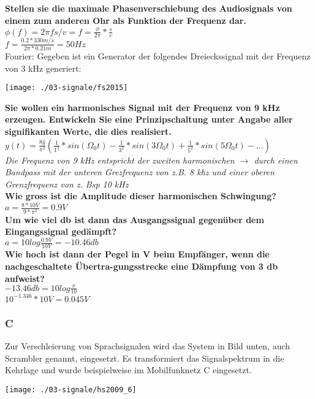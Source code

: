 \textbf{Stellen sie die maximale Phasenverschiebung des Audiosignals von einem zum anderen Ohr als Funktion der Frequenz dar.\\}
$\phi(f)=2\pi f s/v = f = \frac{\phi}{2\pi}*\frac{s}{v}$\\
$f=\frac{0.2*330 m/s}{2\pi*0.21m} = 50 Hz$\\

Fourier:  Gegeben ist ein Generator der folgendes Dreieckssignal mit der Frequenz von 3 kHz generiert:
\begin{center}
    \vspace{-8pt}
    \texttt{[image: ./03-signale/fs2015]}
    \vspace{-8pt}
\end{center}

\textbf{Sie wollen ein harmonisches Signal mit der Frequenz von 9 kHz erzeugen. Entwickeln Sie eine Prinzipschaltung unter Angabe aller signifikanten Werte, die dies realisiert.}\\
$y(t)=\frac{8\hat{y}}{\pi^2}(\frac{1}{1^2}*sin(\Omega_0 t)-\frac{1}{3^2}*sin(3\Omega_0 t)+\frac{1}{5^2}*sin(5\Omega_0 t)-...)$\\
\textit{Die Frequenz von 9 kHz entspricht der zweiten harmonischen $\rightarrow$ durch einen Bandpass mit der unteren Grezfrequenz von z.B. 8 khz und einer oberen Grenzfrequenz von z. Bsp 10 kHz }\\

\textbf{Wie gross ist die Amplitude dieser harmonischen Schwingung?}\\
$a=\frac{8*10V}{9*\pi^2}=0.9V$\\

\textbf{Um wie viel db ist dann das Ausgangssignal gegenüber dem Eingangssignal gedämpft?}\\
$a=10log\frac{0.9V}{10V}=-10.46db$\\

\textbf{Wie hoch ist dann der Pegel in V beim Empfänger, wenn die nachgeschaltete Übertra-gungsstrecke eine Dämpfung von 3 db aufweist?}\\
$-13.46db = 10log\frac{x}{10}$\\
$10^{-1.346}*10V = 0.045V$

\subsubsection{C}
Zur Verschleierung von Sprachsignalen wird das System in Bild unten, auch Scrambler genannt, eingesetzt. Es transformiert das Signalspektrum in die Kehrlage und wurde beispielweise im Mobilfunknetz C eingesetzt.\\
\begin{center}
    \vspace{-8pt}
    \texttt{[image: ./03-signale/hs2009\_6]}
    \vspace{-8pt}
\end{center}

